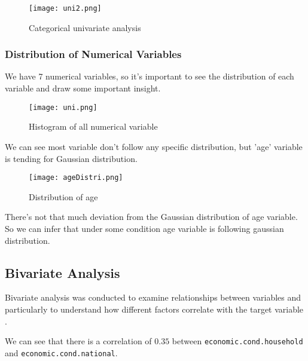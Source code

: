 \documentclass[12pt]{article}
\begin{document}
\begin{figure}[H]
    \centering
    \texttt{[image: uni2.png]}
    \caption{Categorical univariate analysis}
    \label{fig:example}
\end{figure}



\subsubsection{Distribution of Numerical Variables}

We have 7 numerical variables, so it's important to see the distribution of each variable and draw some important insight.
\begin{figure}[H]
    \centering
    \texttt{[image: uni.png]}
    \caption{Histogram of all numerical variable}
    \label{fig:example}
\end{figure}

We can see most variable don't follow any specific distribution, but 'age' variable is tending for Gaussian distribution.

\begin{figure}[H]
    \centering
    \texttt{[image: ageDistri.png]}
    \caption{Distribution of age}
    \label{fig:age_dist}
\end{figure}

There's not that much deviation from the Gaussian distribution of age variable. So we can infer that under some condition age variable is following gaussian distribution.





\subsection{Bivariate Analysis}

Bivariate analysis was conducted to examine relationships between variables and particularly to understand how different factors correlate with the target variable .

We can see that there is a correlation of $0.35$ between \texttt{economic.cond.household} and \texttt{economic.cond.national}. 
\end{document}

